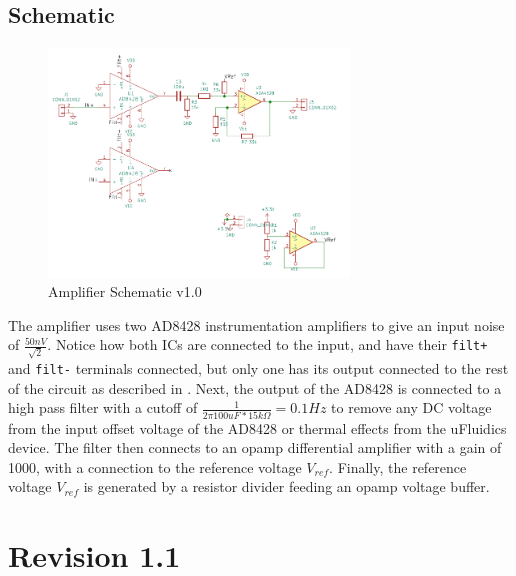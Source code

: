\documentclass[10pt, journal]{IEEEtran}
\begin{document}
\subsection{Schematic}

\begin{figure}[ht!]
  \includegraphics[width=8cm]{../photos/amp.png}
  \caption{Amplifier Schematic v1.0}
  \label{fig:amp}
\end{figure}

The amplifier uses two AD8428 instrumentation amplifiers to give an
input noise of $\frac{50nV}{\sqrt{2}}$\cite{ad8428-parallel}. Notice
how both ICs are connected to the input, and have their \texttt{filt+}
and \texttt{filt-} terminals connected, but only one has its output
connected to the rest of the circuit as described in
\cite{ad8428-parallel}. Next, the output of the AD8428 is connected to
a high pass filter with a cutoff of $\frac{1}{2\pi 100uF * 15k\Omega}
= 0.1Hz$ to remove any DC voltage from the input offset voltage of the
AD8428 or thermal effects from the uFluidics device. The filter then
connects to an opamp differential amplifier with a gain of 1000, with
a connection to the reference voltage $V_{ref}$. Finally, the
reference voltage $V_{ref}$ is generated by a resistor divider
feeding an opamp voltage buffer.

\section{Revision 1.1}
\end{document}
